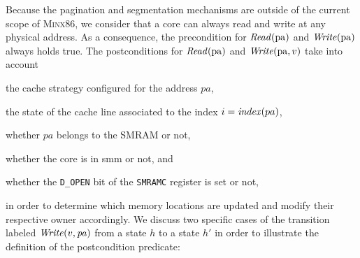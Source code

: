 Because the pagination and segmentation mechanisms are outside of the current
scope of {\scshape Minx86}, we consider that a core can always read and write at
any physical address.
%
As a consequence, the precondition for \( \mathit{Read}(\mathrm{pa}) \) and
\( \mathit{Write}(\mathrm{pa}) \) always holds true.
%
The postconditions for \( \mathit{Read}(\mathrm{pa}) \) and
\( \mathit{Write}(\mathrm{pa}, v) \) take into account
%
\begin{inparaenum}[(1)]
\item the cache strategy configured for the address \( pa \),
\item the state of the cache line associated to the index
  \( i = \mathit{index}(pa) \),
\item whether \( pa \) belongs to the SMRAM or not,
\item whether the core is in \ac{smm} or not, and
\item whether the \texttt{D\_OPEN} bit of the \texttt{SMRAMC} register is set or
  not,
\end{inparaenum}
%
in order to determine which memory locations are updated and modify their
respective owner accordingly.
%
We discuss two specific cases of the transition labeled
\( \mathit{Write}(v, \mathit{pa}) \) from a state \( h \) to a state \( h' \) in
order to illustrate the definition of the postcondition predicate:
%

